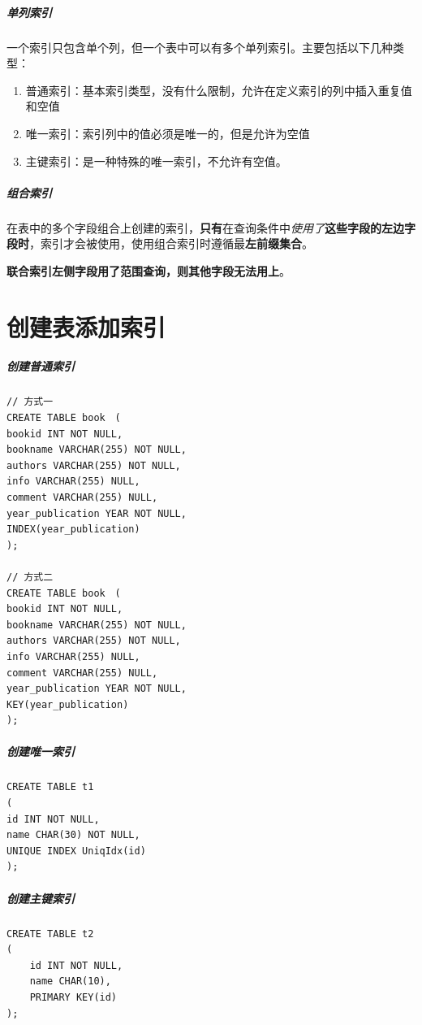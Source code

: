 \documentclass[UTF8,a4paper,12pt]{ctexbook}
\begin{document}
		\subparagraph{单列索引}
			一个索引只包含单个列，但一个表中可以有多个单列索引。主要包括以下几种类型：
			\begin{enumerate}[itemindent = 2em]
				\item 普通索引：基本索引类型，没有什么限制，允许在定义索引的列中插入重复值和空值
				\item 唯一索引：索引列中的值必须是唯一的，但是允许为空值
				\item 主键索引：是一种特殊的唯一索引，不允许有空值。
			\end{enumerate}
			
		\subparagraph{组合索引}
			在表中的多个字段组合上创建的索引，\textbf{只有}在查询条件中\textit{使用了}\textbf{这些字段的左边字段时}，索引才会被使用，使用组合索引时遵循最\textbf{左前缀集合}。
		
			\textbf{联合索引左侧字段用了范围查询，则其他字段无法用上}。
			
	\section{创建表添加索引}
		\subparagraph{创建普通索引}
			\begin{lstlisting}
// 方式一
CREATE TABLE book　(
bookid INT NOT NULL,　　　　　　　　　　　　　　　
bookname VARCHAR(255) NOT NULL,　　　　　　　　　　 
authors VARCHAR(255) NOT NULL,　　　　　　　　　　　 
info VARCHAR(255) NULL,　　　　　　　　　　　　　　　　
comment VARCHAR(255) NULL,　　　　　　　　　　　　　
year_publication YEAR NOT NULL,　　　　　　　　　　　
INDEX(year_publication)　　　　　　　　　　　　　　　
);

// 方式二
CREATE TABLE book　(
bookid INT NOT NULL,　　　　　　　　　　　　　　　
bookname VARCHAR(255) NOT NULL,　　　　　　　　　　 
authors VARCHAR(255) NOT NULL,　　　　　　　　　　　 
info VARCHAR(255) NULL,　　　　　　　　　　　　　　　　
comment VARCHAR(255) NULL,　　　　　　　　　　　　　
year_publication YEAR NOT NULL,　　　　　　　　　　　
KEY(year_publication)　　　　　　　　　　　　　　　
);　　　　　　　　　　　　　　　　　　　　　　　　　　　　　　　　　　　　　　　　　　　　　　　　
			\end{lstlisting}
		\subparagraph{创建唯一索引}
			\begin{lstlisting}
CREATE TABLE t1
(
id INT NOT NULL,
name CHAR(30) NOT NULL,
UNIQUE INDEX UniqIdx(id)
);　
			\end{lstlisting}
		\subparagraph{创建主键索引}
			\begin{lstlisting}
CREATE TABLE t2
(
	id INT NOT NULL,
	name CHAR(10),
	PRIMARY KEY(id)
);
			\end{lstlisting}
		
\end{document}
